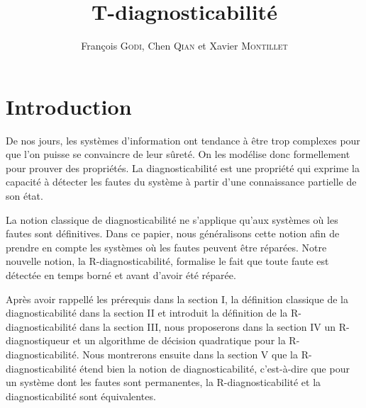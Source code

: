 \documentclass[10pt,a4paper]{article}
\author{Fran\c{c}ois \textsc{Godi}, Chen \textsc{Qian} et Xavier \textsc{Montillet}}
\title{T-diagnosticabilit\'e}
\begin{document}
\maketitle

\section*{Introduction}

De nos jours, les syst\`emes d'information ont tendance \`a \^etre trop complexes pour que l'on puisse se convaincre de leur sûret\'e. On les mod\'elise donc formellement pour prouver des propriétés. La diagnosticabilit\'e est une propri\'et\'e qui exprime la capacit\'e \`a d\'etecter les fautes du syst\`eme \`a partir d'une connaissance partielle de son \'etat.

La notion classique de diagnosticabilit\'e\cite{SamSRST96} ne s'applique qu'aux systèmes où les fautes sont définitives. Dans ce papier, nous généralisons cette notion afin de prendre en compte les systèmes où les fautes peuvent être r\'eparées. Notre nouvelle notion, la R-diagnosticabilit\'e, formalise le fait que toute faute est détectée en temps born\'e et avant d'avoir été r\'epar\'ee.

Après avoir rappellé les prérequis dans la section I, la définition classique de la diagnosticabilité dans la section II et introduit la définition de la R-diagnosticabilit\'e dans la section III, nous proposerons dans la section IV un R-diagnostiqueur et un algorithme de d\'ecision quadratique pour la R-diagnosticabilit\'e. Nous montrerons ensuite dans la section V que la R-diagnosticabilit\'e \'etend bien la notion de diagnosticabilit\'e, c'est-\`a-dire que pour un syst\`eme dont les fautes sont permanentes, la R-diagnosticabilit\'e et la diagnosticabilit\'e sont \'equivalentes.
\end{document}

